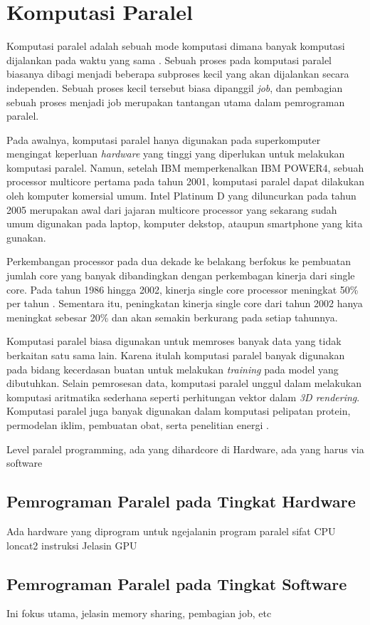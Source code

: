 \section{Komputasi Paralel}
Komputasi paralel adalah sebuah mode komputasi dimana banyak komputasi dijalankan pada waktu yang sama \citep{highly_parallel_computing}. Sebuah proses pada komputasi paralel biasanya dibagi menjadi beberapa subproses kecil yang akan dijalankan secara independen. Sebuah proses kecil tersebut biasa dipanggil \textit{job}, dan pembagian sebuah proses menjadi job merupakan tantangan utama dalam pemrograman paralel.

Pada awalnya, komputasi paralel hanya digunakan pada superkomputer mengingat keperluan \textit{hardware} yang tinggi yang diperlukan untuk melakukan komputasi paralel. Namun, setelah IBM memperkenalkan IBM POWER4, sebuah processor multicore pertama pada tahun 2001, komputasi paralel dapat dilakukan oleh komputer komersial umum. Intel Platinum D yang diluncurkan pada tahun 2005 merupakan awal dari jajaran multicore processor yang sekarang sudah umum digunakan pada laptop, komputer dekstop, ataupun smartphone yang kita gunakan. 

Perkembangan processor pada dua dekade ke belakang berfokus ke pembuatan jumlah core yang banyak dibandingkan dengan perkembagan kinerja dari single core. Pada tahun 1986 hingga 2002, kinerja single core processor meningkat 50\% per tahun \citep{comp_arch_patterson}. Sementara itu, peningkatan kinerja single core dari tahun 2002 hanya meningkat sebesar 20\% \citep{intro_parallel} dan akan semakin berkurang pada setiap tahunnya. 


Komputasi paralel biasa digunakan untuk memroses banyak data yang tidak berkaitan satu sama lain. Karena itulah komputasi paralel banyak digunakan pada bidang kecerdasan buatan untuk melakukan \textit{training} pada model yang dibutuhkan. Selain pemrosesan data, komputasi paralel unggul dalam melakukan komputasi aritmatika sederhana seperti perhitungan vektor dalam \textit{3D rendering}. Komputasi paralel juga banyak digunakan dalam komputasi pelipatan protein, permodelan iklim, pembuatan obat, serta penelitian energi \citep{intro_parallel}. 



Level paralel programming, ada yang dihardcore di Hardware, ada yang harus via software
\subsection{Pemrograman Paralel pada Tingkat Hardware}
Ada hardware yang diprogram untuk ngejalanin program paralel
sifat CPU loncat2 instruksi
Jelasin GPU
\subsection{Pemrograman Paralel pada Tingkat Software}
Ini fokus utama, jelasin memory sharing, pembagian job, etc
